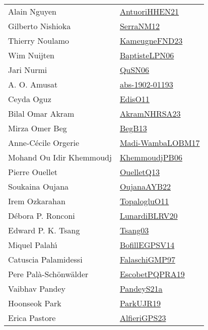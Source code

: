{\begin{longtable}{p{4cm}p{20cm}}
Alain Nguyen & \href{papers/AntuoriHHEN21.pdf}{AntuoriHHEN21}\cite{AntuoriHHEN21} \\
Gilberto Nishioka & \href{papers/SerraNM12.pdf}{SerraNM12}\cite{SerraNM12} \\
Thierry Noulamo & \href{papers/KameugneFND23.pdf}{KameugneFND23}\cite{KameugneFND23} \\
Wim Nuijten & \href{}{BaptisteLPN06}\cite{BaptisteLPN06} \\
Jari Nurmi & \href{papers/QuSN06.pdf}{QuSN06}\cite{QuSN06} \\
A. O. Amusat & \href{articles/abs-1902-01193.pdf}{abs-1902-01193}\cite{abs-1902-01193} \\
Ceyda Oguz & \href{papers/EdisO11.pdf}{EdisO11}\cite{EdisO11} \\
Bilal Omar Akram & \href{articles/AkramNHRSA23.pdf}{AkramNHRSA23}\cite{AkramNHRSA23} \\
Mirza Omer Beg & \href{}{BegB13}\cite{BegB13} \\
Anne{-}C{\'{e}}cile Orgerie & \href{papers/Madi-WambaLOBM17.pdf}{Madi-WambaLOBM17}\cite{Madi-WambaLOBM17} \\
Mohand Ou Idir Khemmoudj & \href{papers/KhemmoudjPB06.pdf}{KhemmoudjPB06}\cite{KhemmoudjPB06} \\
Pierre Ouellet & \href{papers/OuelletQ13.pdf}{OuelletQ13}\cite{OuelletQ13} \\
Soukaina Oujana & \href{papers/OujanaAYB22.pdf}{OujanaAYB22}\cite{OujanaAYB22} \\
Irem Ozkarahan & \href{articles/TopalogluO11.pdf}{TopalogluO11}\cite{TopalogluO11} \\
D{\'{e}}bora P. Ronconi & \href{articles/LunardiBLRV20.pdf}{LunardiBLRV20}\cite{LunardiBLRV20} \\
Edward P. K. Tsang & \href{articles/Tsang03.pdf}{Tsang03}\cite{Tsang03} \\
Miquel Palah{\'{\i}} & \href{papers/BofillEGPSV14.pdf}{BofillEGPSV14}\cite{BofillEGPSV14} \\
Catuscia Palamidessi & \href{articles/FalaschiGMP97.pdf}{FalaschiGMP97}\cite{FalaschiGMP97} \\
Pere Pal{\`{a}}{-}Sch{\"{o}}nw{\"{a}}lder & \href{articles/EscobetPQPRA19.pdf}{EscobetPQPRA19}\cite{EscobetPQPRA19} \\
Vaibhav Pandey & \href{articles/PandeyS21a.pdf}{PandeyS21a}\cite{PandeyS21a} \\
Hoonseok Park & \href{papers/ParkUJR19.pdf}{ParkUJR19}\cite{ParkUJR19} \\
Erica Pastore & \href{articles/AlfieriGPS23.pdf}{AlfieriGPS23}\cite{AlfieriGPS23} \\

\end{longtable}}

